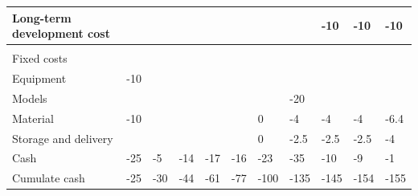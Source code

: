 \documentclass[12pt,twoside]{article}
\begin{document}
\begin{table}[]
\begin{tabular}{|l|l|l|l|l|l|l|l|l|l|l|}
    Long-term development cost   &     &     &     &     &     &      &      & -10  & -10  & -10  \\ \hline
                                 &     &     &     &     &     &      &      &      &      &      \\ \hline
    Fixed costs                  &     &     &     &     &     &      &      &      &      &      \\ \hline
    Equipment                    & -10 &     &     &     &     &      &      &      &      &      \\ \hline
    Models                       &     &     &     &     &     &      & -20  &      &      &      \\ \hline
    Material                     & -10 &     &     &     &     & 0    & -4   & -4   & -4   & -6.4 \\ \hline
    Storage and delivery         &     &     &     &     &     & 0    & -2.5 & -2.5 & -2.5 & -4   \\ \hline
    Cash                         & -25 & -5  & -14 & -17 & -16 & -23  & -35  & -10  & -9   & -1   \\ \hline
    Cumulate cash                & -25 & -30 & -44 & -61 & -77 & -100 & -135 & -145 & -154 & -155  \\ \hline
    \end{tabular}
    \label{chart:Financial detail 1}
\end{table}
\end{document}
